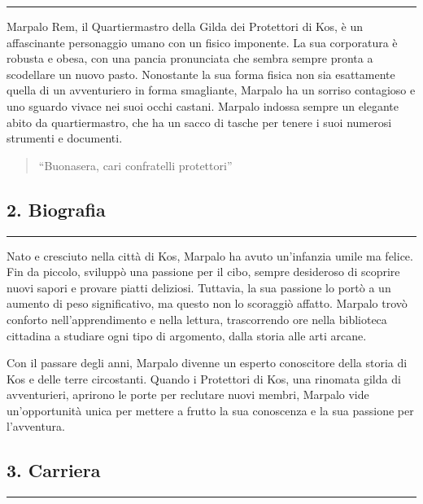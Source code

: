 \begin{center}\rule{0.5\linewidth}{0.5pt}\end{center}

Marpalo Rem, il Quartiermastro della Gilda dei Protettori di Kos, è un
affascinante personaggio umano con un fisico imponente. La sua
corporatura è robusta e obesa, con una pancia pronunciata che sembra
sempre pronta a scodellare un nuovo pasto. Nonostante la sua forma
fisica non sia esattamente quella di un avventuriero in forma
smagliante, Marpalo ha un sorriso contagioso e uno sguardo vivace nei
suoi occhi castani. Marpalo indossa sempre un elegante abito da
quartiermastro, che ha un sacco di tasche per tenere i suoi numerosi
strumenti e documenti.

\begin{quote}
``Buonasera, cari confratelli protettori''
\end{quote}

\subsection{2. Biografia}\label{biografia}

\begin{center}\rule{0.5\linewidth}{0.5pt}\end{center}

Nato e cresciuto nella città di Kos, Marpalo ha avuto un'infanzia umile
ma felice. Fin da piccolo, sviluppò una passione per il cibo, sempre
desideroso di scoprire nuovi sapori e provare piatti deliziosi.
Tuttavia, la sua passione lo portò a un aumento di peso significativo,
ma questo non lo scoraggiò affatto. Marpalo trovò conforto
nell'apprendimento e nella lettura, trascorrendo ore nella biblioteca
cittadina a studiare ogni tipo di argomento, dalla storia alle arti
arcane.

Con il passare degli anni, Marpalo divenne un esperto conoscitore della
storia di Kos e delle terre circostanti. Quando i Protettori di Kos, una
rinomata gilda di avventurieri, aprirono le porte per reclutare nuovi
membri, Marpalo vide un'opportunità unica per mettere a frutto la sua
conoscenza e la sua passione per l'avventura.

\subsection{3. Carriera}\label{carriera}

\begin{center}\rule{0.5\linewidth}{0.5pt}\end{center}

